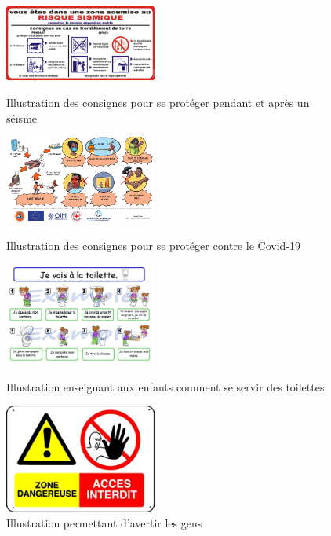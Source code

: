 	\begin{figure}[ht]
		\vspace{10pt}
		\centering
		\begin{minipage}{0.45\textwidth}
			\centering
			\includegraphics[width=5cm]{Pictures/RisqueSismique.jpg}
			\caption{Illustration des consignes pour se prot\'eger pendant et apr\`es un s\'e\"isme}
			\label{ConsigneSeisme}
		\end{minipage}
		\hspace{10pt}
		\begin{minipage}{0.45\textwidth}
			\centering
			\includegraphics[width=5cm]{Pictures/FigCovid.png}
			\caption{Illustration des consignes pour se prot\'eger contre le Covid-19}
			\label{FigCovid}
		\end{minipage}

		\vspace{10pt}

		\begin{minipage}{0.45\textwidth}
			\centering
			\includegraphics[width=5cm]{Pictures/SeServirDeLaToilettePourEnfant.jpg}
			\caption{Illustration enseignant aux enfants comment se servir des toilettes}
			\label{ConsigneToillette}
		\end{minipage}
		\hspace{10pt}
		\begin{minipage}{0.45\textwidth}
			\centering
			\includegraphics[width=5cm]{Pictures/Avertissement.jpg}
			\caption{Illustration permettant d'avertir les gens}
			\label{Avertissement}
		\end{minipage}
	\end{figure}


